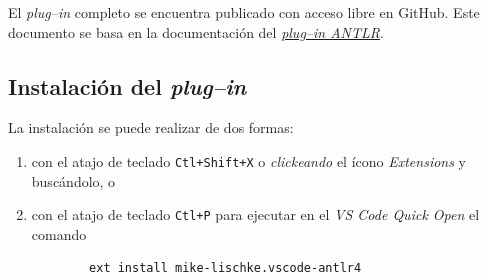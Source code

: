 El \emph{plug--in} completo se encuentra publicado con acceso libre en GitHub.  Este documento se basa en la documentación del \href{https://github.com/mike-lischke/vscode-antlr4/tree/master/doc}{\emph{plug--in ANTLR}}.


\subsection*{Instalación del \emph{plug--in}}
\label{instalacionANTLR}

La instalación se puede realizar de dos formas:
\begin{enumerate}
	\item con el atajo de teclado \verb|Ctl+Shift+X| o \emph{clickeando} el ícono \emph{Extensions} y buscándolo, o
    \item con el atajo de teclado \verb|Ctl+P| para ejecutar en el \emph{VS Code Quick Open} el comando
    \begin{verbatim}
		ext install mike-lischke.vscode-antlr4
	\end{verbatim}
\end{enumerate}


